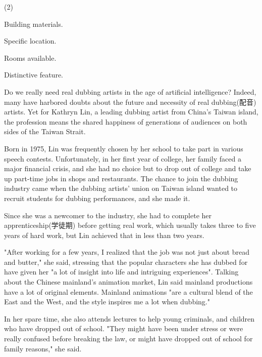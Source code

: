 \documentclass{英语试卷}
\begin{document}
\begin{choices}(2)
  \item Building materials.
  \item Specific location.
  \item Rooms available.
  \item Distinctive feature.
\end{choices}
\par Do we really need real dubbing artists in the age of artificial intelligence? Indeed, many have harbored doubts about the future and necessity of real dubbing(配音) artists. Yet for Kathryn Lin, a leading dubbing artist from China's Taiwan island, the profession means the shared happiness of generations of audiences on both sides of the Taiwan Strait.\par
\par Born in 1975, Lin was frequently chosen by her school to take part in various speech contests. Unfortunately, in her first year of college, her family faced a major financial crisis, and she had no choice but to drop out of college and take up part-time jobs in shops and restaurants. The chance to join the dubbing industry came when the dubbing artists' union on Taiwan island wanted to recruit students for dubbing performances, and she made it.\par
\par Since she was a newcomer to the industry, she had to complete her apprenticeship(学徒期) before getting real work, which usually takes three to five years of hard work, but Lin achieved that in less than two years.\par
\par "After working for a few years, I realized that the job was not just about bread and butter," she said, stressing that the popular characters she has dubbed for have given her "a lot of insight into life and intriguing experiences". Talking about the Chinese mainland's animation market, Lin said mainland productions have a lot of original elements. Mainland animations "are a cultural blend of the East and the West, and the style inspires me a lot when dubbing."\par
\par In her spare time, she also attends lectures to help young criminals, and children who have dropped out of school. "They might have been under stress or were really confused before breaking the law, or might have dropped out of school for family reasons," she said.\par
\end{document}
